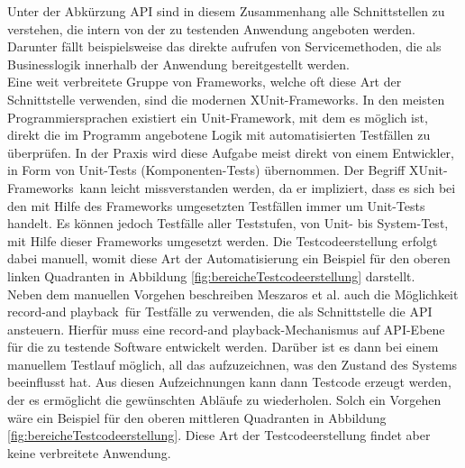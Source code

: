 Unter der Abkürzung API sind in diesem Zusammenhang alle Schnittstellen zu verstehen, die intern von der zu testenden Anwendung angeboten werden. Darunter fällt beispielsweise das direkte aufrufen von Servicemethoden, die als Businesslogik innerhalb der Anwendung bereitgestellt werden.\\
Eine weit verbreitete Gruppe von Frameworks, welche oft diese Art der Schnittstelle verwenden, sind die modernen \grq XUnit-Frameworks\grq. In den meisten Programmiersprachen existiert ein Unit-Framework, mit dem es möglich ist, direkt die im Programm angebotene Logik mit automatisierten Testfällen zu überprüfen. In der Praxis wird diese Aufgabe meist direkt von einem Entwickler, in Form von Unit-Tests (Komponenten-Tests) übernommen. Der Begriff \grq XUnit-Frameworks\grq\ kann leicht missverstanden werden, da er impliziert, dass es sich bei den mit Hilfe des Frameworks umgesetzten Testfällen immer um Unit-Tests handelt. Es können jedoch Testfälle aller Teststufen, von Unit- bis System-Test, mit Hilfe dieser Frameworks umgesetzt werden.
Die Testcodeerstellung erfolgt dabei manuell, womit diese Art der Automatisierung ein Beispiel für den oberen linken Quadranten in Abbildung \ref{fig:bereicheTestcodeerstellung} darstellt.\\
Neben dem manuellen Vorgehen beschreiben Meszaros et al. \cite{meszaros_agile_2003} auch die Möglichkeit \grq record-and playback\grq\ für Testfälle zu verwenden, die als Schnittstelle die API ansteuern.
Hierfür muss eine \grq record-and playback\grq-Mechanismus auf API-Ebene für die zu testende Software entwickelt werden. Darüber ist es dann bei einem manuellem Testlauf möglich, all das aufzuzeichnen, was den Zustand des Systems beeinflusst hat. Aus diesen Aufzeichnungen kann dann Testcode erzeugt werden, der es ermöglicht die gewünschten Abläufe zu wiederholen. Solch ein Vorgehen wäre ein Beispiel für den oberen mittleren Quadranten in Abbildung \ref{fig:bereicheTestcodeerstellung}. Diese Art der Testcodeerstellung findet aber keine verbreitete Anwendung.

